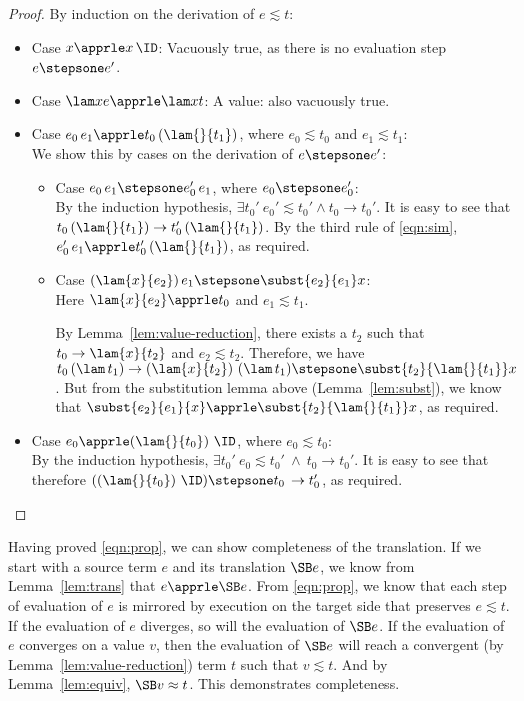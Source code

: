 \begin{proof}
By induction on the derivation of $e\apprle t$:
\begin{itemize}
\item Case $x \apprle x\,\ID$:
Vacuously true, as there is no evaluation step $e\stepsone e'$.
\item Case $\lam x e \apprle \lam x t$:
A value: also vacuously true.
\item Case $e_0\,e_1\apprle t_0\,(\lam{}{t_1})$, where $e_0\apprle t_0$ and $e_1\apprle t_1$:\\
We show this by cases on the derivation of $e\stepsone e'$:
\begin{itemize}
\item Case $e_0\,e_1\stepsone e_0'\,e_1$, where $e_0\stepsone e_0'$:\\
By the induction hypothesis, $\exists t_0'\ e_0'\apprle t_0'\wedge t_0\to t_0'$.
It is easy to see that $t_0\,(\lam{}{t_1})\to t_0'\,(\lam{}{t_1})$.
By the third rule of \eqref{eqn:sim}, $e_0'\,e_1 \apprle t_0'\,(\lam{}{t_1})$, as required.

\item Case $(\lam{x}{e_2})\,e_1\stepsone \subst{e_2}{e_1}x$:\\
Here $\lam{x}{e_2} \apprle t_0$ and $e_1\apprle t_1$. 

By Lemma~\ref{lem:value-reduction}, there exists a $t_2$
such that $t_0 \to \lam{x}{t_2}$ and $e_2 \apprle t_2$. Therefore,
we have $t_0\,(\lam \, t_1) \to (\lam{x}{t_2})~(\lam \, t_1)
\stepsone \subst{t_2}{\lam{}{t_1}}x$. But from the substitution lemma
above (Lemma~\ref{lem:subst}),
we know that $\subst{e_2}{e_1}{x} \apprle \subst{t_2}{\lam{}{t_1}}x$,
as required.
\end{itemize}

\item Case $e_0 \apprle (\lam{}{t_0})~\ID$, where $e_0\apprle t_0$: \\
By the induction hypothesis, $\exists t_0'\ e_0\apprle t_0'\ \wedge\ t_0\to t_0'$.
It is easy to see that therefore
$((\lam{}{t_0})~\ID) \stepsone t_0\,\to t_0'$, as required.
\end{itemize}
\end{proof}

Having proved \eqref{eqn:prop}, we can show completeness of the
translation. If we start with a source term $e$ and its translation
$\SB e $, we know from Lemma~\ref{lem:trans} that $e \apprle \SB e $. From
\eqref{eqn:prop}, we know that each step of evaluation of $e$
is mirrored by execution on the target side that preserves $e\apprle t$.
If the evaluation of $e$ diverges, so will the evaluation of $\SB e$.
If the evaluation of $e$ converges on a value $v$, then
the evaluation of $\SB e$ will reach a convergent (by
Lemma~\ref{lem:value-reduction}) term $t$ such that
$v \apprle t$. And by Lemma~\ref{lem:equiv}, $\SB v \approx t$. This demonstrates
completeness.

